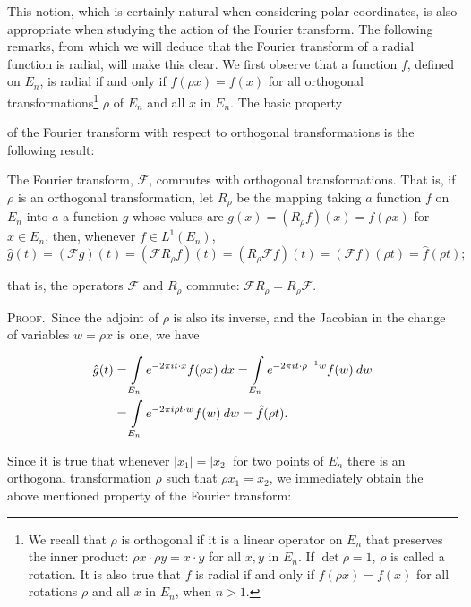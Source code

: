This notion, which is certainly natural when considering polar coordinates, is also appropriate when studying the action of the Fourier transform. The following remarks, from which we will deduce that the Fourier transform of a radial function is radial, will make this clear. We first observe that a function $f$, defined on $E_n$, is radial if and only if $f(\rho x) = f(x)$ for all orthogonal transformations\footnote{We recall that $\rho$ is orthogonal if it is a linear operator on $E_n$ that preserves the inner product: $\rho x \cdot \rho y = x \cdot y$ for all $x, y$ in $E_n$. If $\det \rho = 1$, $\rho$ is called a rotation. It is also true that $f$ is radial if and only if $f(\rho x) = f(x)$ for all rotations $\rho$ and all $x$ in $E_n$, when $n > 1$.} $\rho$ of $E_n$ and all $x$ in $E_n$. The basic property

of the Fourier transform with respect to orthogonal transformations is the following result:

\begin{theorem}
\label{thm:c4-1-1}
The Fourier transform, $\mathcal{F}$, commutes with orthogonal transformations. That is, if $\rho$ is an orthogonal transformation, let $R_\rho$ be the mapping taking $a$ function $f$ on $E_n$ into $a$ a function $g$ whose values are $g(x) = (R_\rho f)(x) = f(\rho x)$ for $x \in E_n$, then, whenever $f \in L^1(E_n)$,
\[
\hat{g}(t)=(\mathcal{F}g)(t)=(\mathcal{F}R_{\rho}f)(t)=(R_{\rho}\mathcal{F}f)(t)=(\mathcal{F}f)(\rho t)=\hat{f}(\rho t);
\]

that is, the operators $\mathscr{F}$ and $R_{\rho}$ commute: $\mathscr{F}R_{\rho} = R_{\rho}\mathscr{F}$.
\end{theorem}

\textsc{Proof.}\ Since the adjoint of $\rho$ is also its inverse, and the Jacobian in the change of variables $w = \rho x$ is one, we have

\[
\begin{aligned}{\hat{g}(t)}&{{}=\intop_{E_{n}}e^{-2\pi i t\cdot x}f(\rho x)\:d x=\intop_{E_{n}}e^{-2\pi i t\cdot\rho^{-1}w}f(w)\:d w}\\ {}&{{}=\intop_{E_{n}}e^{-2\pi i\rho t\cdot w}f(w)\:d w=\hat{f}(\rho t).}\\ \end{aligned}
\]

Since it is true that whenever $|x_1| = |x_2|$ for two points of $E_n$ there is an orthogonal transformation $\rho$ such that $\rho x_1 = x_2$, we immediately obtain the above mentioned property of the Fourier transform:


